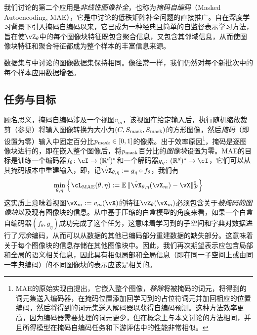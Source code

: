 \documentclass[../../book-main.tex]{subfiles}
\begin{document}
我们讨论的第二个应用是\textit{非线性图像补全}，也称为\textit{掩码自编码}（Masked Autoencoding, MAE），它是中讨论的低秩矩阵补全问题的直接推广。自\cite{he2022masked}在深度学习背景下引入掩码自编码以来，它已成为一种经典且简单的自监督表示学习方法，旨在使\(\vZ_{\theta}\)中的每个图像块特征既包含聚合信息，又包含其邻域信息，从而使图像块特征和聚合特征都成为整个样本的丰富信息来源。

数据集与中讨论的图像数据集保持相同。像往常一样，我们仍然对每个新批次中的每个样本应用数据增强。

\subsection{任务与目标}\label{sub:image_completion_objective}

顾名思义，掩码自编码涉及一个视图\(v_{m}\)，该视图在给定输入后，执行随机缩放裁剪（参见）将输入图像转换为大小为\((C, S_{\mathrm{mask}}, S_{\mathrm{mask}})\)的方形图像，然后\textit{掩码}（即设置为零）输入中固定百分比\(p_{\mathrm{mask}} \in [0, 1]\)的像素。出于效率原因\footnote{MAE的原始实现由\cite{he2022masked}提出，它嵌入整个图像，\textit{移除}将被掩码的词元，将得到的词元集送入编码器，在掩码位置添加回学习到的占位符词元并加回相应的位置编码，然后将得到的词元集送入解码器以获得自编码预测。这种方法效率更高，因为编码器需要处理的词元更少，但在概念上与本文讨论的方法相同，并且所得模型在掩码自编码任务和下游评估中的性能非常相似。}，掩码是逐图像块进行的，即在嵌入整个图像后，将\(p_{\mathrm{mask}}\)百分比的\textit{图像块}设置为零。MAE的目标是训练一个编码器\(f_{\theta} \colon \cI \to (\R^{d})^{*}\)和一个解码器\(g_{\eta} \colon (\R^{d})^{*} \to \cI\)，它们可以从其掩码版本中重建输入，即，记\(\hat{\vX}_{\theta, \eta} := g_{\eta} \circ f_{\theta}\)，我们有
\begin{equation}
    \min_{\theta, \eta}\bc{\cL_{\mathrm{MAE}}(\theta, \eta) := \Ex\norm{\hat{\vX}_{\theta, \eta}(\vX_{m}) - \vX}_{F}^{2}}
\end{equation}
这实质上意味着视图\(\vX_{m} := v_{m}(\vX)\)的特征\(\vZ_{\theta}(\vX_{m})\)必须包含关于\textit{被掩码的图像块}以及现有图像块的信息。从中基于压缩的白盒模型的角度来看，如果一个白盒自编码器\((f_{\theta}, g_{\eta})\)成功完成了这个任务，这意味着学习到的子空间和字典对数据进行了\textit{冗余}编码，从而可以从数据的其他已编码部分重建数据的缺失部分。这意味着关于每个图像块的信息存储在其他图像块中。因此，我们再次期望表示应包含局部和全局的语义相关信息，因此具有相似局部和全局信息（即在同一子空间上或由同一字典编码）的不同图像块的表示应该是相关的。
\end{document}
